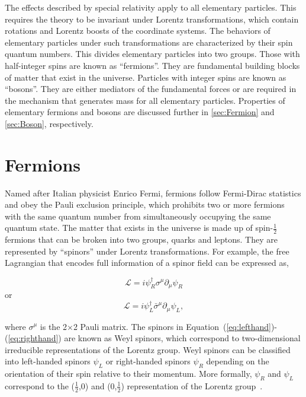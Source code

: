 The effects described by special relativity apply to all elementary particles. This requires the theory to be invariant under Lorentz transformations, which contain rotations and Lorentz boosts of the coordinate systems. The behaviors of elementary particles under such transformations are characterized by their spin quantum numbers. This divides elementary particles into two groups. Those with half-integer spins are known as ``fermions''. They are fundamental building blocks of matter that exist in the universe. Particles with integer spins are known as ``bosons''. They are either mediators of the fundamental forces or are required in the mechanism that generates mass for all elementary particles. Properties of elementary fermions and bosons are discussed further in \autoref{sec:Fermion} and \autoref{sec:Boson}, respectively. 

\section{Fermions}
\label{sec:Fermion}

Named after Italian physicist Enrico Fermi, fermions follow Fermi-Dirac statistics and obey the Pauli exclusion principle, which prohibits two or more fermions with the same quantum number from simultaneously occupying the same quantum state. The matter that exists in the universe is made up of spin-$\frac{1}{2}$ fermions that can be broken into two groups, quarks and leptons. They are represented by ``spinors'' under Lorentz transformations. For example, the free Lagrangian that encodes full information of a spinor field can be expressed as,

\begin{equation}
\label{eq:lefthand}
\mathcal{L}=i\psi_{R}^{\dagger}\sigma^{\mu}\partial_{\mu}\psi_{R}
\end{equation}
or
\begin{equation}
\label{eq:righthand}
\mathcal{L}=i\psi_{L}^{\dagger}\bar{\sigma}^{\mu}\partial_{\mu}\psi_{L},
\end{equation}

where $\sigma^{\mu}$ is the 2$\times$2 Pauli matrix. The spinors in Equation~(\ref{eq:lefthand})-(\ref{eq:righthand}) are known as Weyl spinors, which correspond to two-dimensional irreducible representations of the Lorentz group. Weyl spinors can be classified into left-handed spinors $\psi_{L}$ or right-handed spinors $\psi_{R}$ depending on the orientation of their spin relative to their momentum. More formally, $\psi_{R}$ and $\psi_{L}$ correspond to the ($\frac{1}{2}$,0) and (0,$\frac{1}{2}$) representation of the Lorentz group~\cite{zee:group}.

